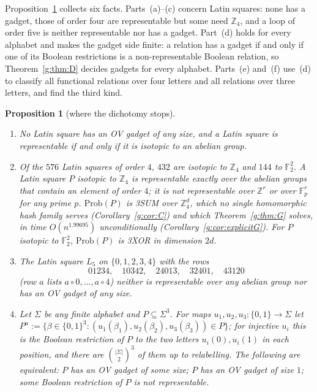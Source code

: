 \documentclass[11pt]{article}
\newtheorem{proposition}[theorem]{Proposition}
\theoremstyle{definition}
\theoremstyle{remark}
\newcommand{\Z}{\mathbb{Z}}
\newcommand{\F}{\mathbb{F}_2}
\newcommand{\Fp}{\mathbb{F}_p}
\newcommand{\Prob}{\mathrm{Prob}}
\newcommand{\ExpHalfBestUp}{1.99695}%
\begin{document}
Proposition~\ref{g:prop:F} collects six facts. Parts~(a)--(c) concern Latin squares: none has a gadget, those of order four are representable but some need $\Z_4$, and a loop of order five is neither representable nor has a gadget. Part~(d) holds for every alphabet and makes the gadget side finite: a relation has a gadget if and only if one of its Boolean restrictions is a non-representable Boolean relation, so Theorem~\ref{g:thm:D} decides gadgets for every alphabet. Parts~(e) and~(f) use~(d) to classify all functional relations over four letters and all relations over three letters, and find the third kind.

\begin{proposition}[where the dichotomy stops]\label{g:prop:F}
\begin{enumerate}[label=\textup{(\alph*)}]
\item No Latin square has an OV gadget of any size, and a Latin square is representable if and only if it is isotopic to an abelian group.
\item Of the $576$ Latin squares of order $4$, $432$ are isotopic to $\Z_4$ and $144$ to $\F^2$. A Latin square $P$ isotopic to $\Z_4$ is representable exactly over the abelian groups that contain an element of order $4$; it is not representable over $\Z^r$ or over $\Fp^r$ for any prime $p$. $\Prob(P)$ is 3SUM over $\Z_4^d$, which no single homomorphic hash family serves (Corollary~\ref{g:cor:C}) and which Theorem~\ref{g:thm:G} solves, in time $O(n^{\ExpHalfBestUp})$ unconditionally (Corollary~\ref{g:cor:explicitG}). For $P$ isotopic to $\F^2$, $\Prob(P)$ is 3XOR in dimension $2d$.
\item The Latin square $L_5$ on $\{0,1,2,3,4\}$ with the rows
\[
01234,\quad10342,\quad24013,\quad32401,\quad43120
\]
(row $a$ lists $a\circ0,\dots,a\circ4$) neither is representable over any abelian group nor has an OV gadget of any size.
\item Let $\Sigma$ be any finite alphabet and $P\subseteq\Sigma^3$. For maps $u_1,u_2,u_3\colon\{0,1\}\to\Sigma$ let $P^u:=\{\beta\in\{0,1\}^3:(u_1(\beta_1),u_2(\beta_2),u_3(\beta_3))\in P\}$; for injective $u_i$ this is the \emph{Boolean restriction} of $P$ to the two letters $u_i(0),u_i(1)$ in each position, and there are $\binom{|\Sigma|}2^3$ of them up to relabelling. The following are equivalent: $P$ has an OV gadget of some size; $P$ has an OV gadget of size $1$; some Boolean restriction of $P$ is not representable.

\end{enumerate}
\end{proposition}
\end{document}

